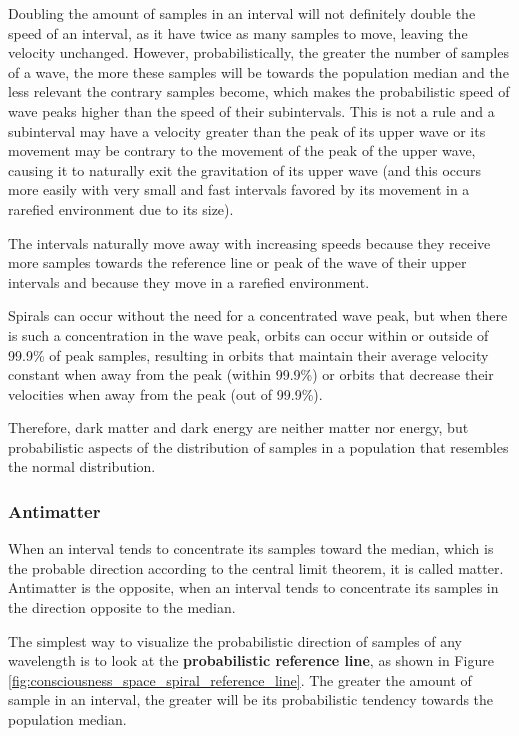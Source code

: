 Doubling the amount of samples in an interval will not definitely double the speed of an interval, as it have twice as many samples to move, leaving the velocity unchanged. However, probabilistically, the greater the number of samples of a wave, the more these samples will be towards the population median and the less relevant the contrary samples become, which makes the probabilistic speed of wave peaks higher than the speed of their subintervals. This is not a rule and a subinterval may have a velocity greater than the peak of its upper wave or its movement may be contrary to the movement of the peak of the upper wave, causing it to naturally exit the gravitation of its upper wave (and this occurs more easily with very small and fast intervals favored by its movement in a rarefied environment due to its size).

The intervals naturally move away with increasing speeds because they receive more samples towards the reference line or peak of the wave of their upper intervals and because they move in a rarefied environment.

Spirals can occur without the need for a concentrated wave peak, but when there is such a concentration in the wave peak, orbits can occur within or outside of 99.9\% of peak samples, resulting in orbits that maintain their average velocity constant when away from the peak (within 99.9\%) or orbits that decrease their velocities when away from the peak (out of 99.9\%).

Therefore, dark matter and dark energy are neither matter nor energy, but probabilistic aspects of the distribution of samples in a population that resembles the normal distribution.

\subsubsection{Antimatter}
When an interval tends to concentrate its samples toward the median, which is the probable direction according to the central limit theorem, it is called matter. Antimatter is the opposite, when an interval tends to concentrate its samples in the direction opposite to the median. 

The simplest way to visualize the probabilistic direction of samples of any wavelength is to look at the \textbf{probabilistic reference line}, as shown in Figure \ref{fig:consciousness_space_spiral_reference_line}. The greater the amount of sample in an interval, the greater will be its probabilistic tendency towards the population median.

